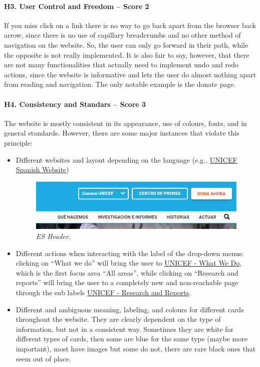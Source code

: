 \paragraph*{H3. User Control and Freedom – Score 2}
If you miss click on a link there is no way to go back apart from the browser back arrow, since there is no use of capillary breadcrumbs and no other method of navigation on the website. So, the user can only go forward in their path, while the opposite is not really implemented.
It is also fair to say, however, that there are not many functionalities that actually need to implement undo and redo actions, since the website is informative and lets the user do almost nothing apart from reading and navigation. The only notable example is the donate page.

\paragraph*{H4. Consistency and Standars – Score 3}
The website is mostly consistent in its appearance, use of colours, fonts, and in general standards. However, there are some major instances that violate this principle:
\begin{itemize}
	\item Different websites and layout depending on the language (e.g., \href{https://www.unicef.org/es}{UNICEF Spanish Website})
	\begin{figure}[h]
		\includegraphics[width=\textwidth]{Picture4.png}
		\captionsetup{font=small}
		\caption{\textit{ES Header.}}
		\label{fig:label4}
	\end{figure}
	\item Different actions when interacting with the label of the drop-down menus: clicking on “What we do” will bring the user to \href{https://www.unicef.org/what-we-do}{UNICEF - What We Do}, which is the first focus area “All areas”, while clicking on “Research and reports” will bring the user to a completely new and non-reachable page through the sub labels \href{https://www.unicef.org/research-and-reports}{UNICEF - Research and Reports}.
	\item Different and ambiguous meaning, labeling, and colours for different cards throughout the website. They are clearly dependent on the type of information, but not in a consistent way. Sometimes they are white for different types of cards, then some are blue for the same type (maybe more important), most have images but some do not, there are rare black ones that seem out of place.
\end{itemize}

